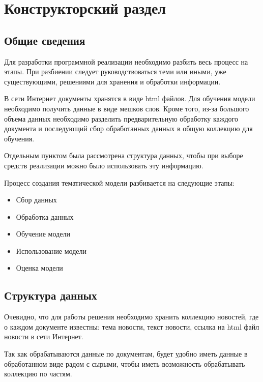 \chapter{Конструкторский раздел}
%
\section{Общие сведения}

Для разработки программной реализации необходимо разбить весь процесс на этапы. При разбиении следует руководствоваться теми или иными, уже существующими, решениями для хранения и обработки информации.

В сети Интернет документы хранятся в виде html файлов.
Для обучения модели необходимо получить данные в виде мешков слов.
Кроме того, из-за большого объема данных необходимо разделить предварительную обработку каждого документа и последующий сбор обработанных данных в общую коллекцию для обучения.

Отдельным пунктом была рассмотрена структура данных, чтобы при выборе средств реализации можно было использовать эту информацию. 

Процесс создания тематической модели разбивается на следующие этапы:

\begin{itemize}
    \item Сбор данных
    \item Обработка данных
    \item Обучение модели
    \item Использование модели
    \item Оценка модели
\end{itemize}


%
\section{Структура данных}


Очевидно, что для работы решения необходимо хранить коллекцию новостей, где о каждом документе известны: тема новости, текст новости, ссылка на html файл новости в сети Интернет.

Так как обрабатываются данные по документам, будет удобно иметь данные в обработанном виде радом с сырыми, чтобы иметь возможность обрабатывать коллекцию по частям.

